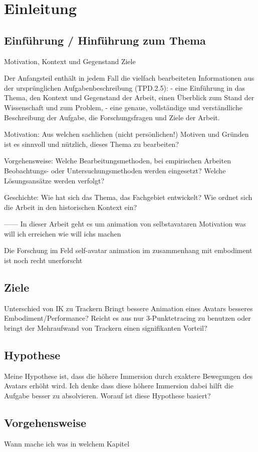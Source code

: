 \chapter{Einleitung}

\section{Einführung / Hinführung zum Thema}
Motivation, Kontext und Gegenstand
Ziele

Der Anfangsteil enthält in jedem Fall die vielfach bearbeiteten Informationen aus der
ursprünglichen Aufgabenbeschreibung (TPD.2.5):
- eine Einführung in das Thema, den Kontext und Gegenstand der Arbeit, einen
Überblick zum Stand der Wissenschaft und zum Problem,
- eine genaue, vollständige und verständliche Beschreibung der Aufgabe, die Forschungsfragen und Ziele der Arbeit.

Motivation: Aus welchen sachlichen (nicht persönlichen!) Motiven und Gründen ist es
sinnvoll und nützlich, dieses Thema zu bearbeiten?

Vorgehensweise: Welche Bearbeitungsmethoden, bei empirischen Arbeiten Beobachtungs- oder Untersuchungsmethoden werden eingesetzt? Welche Lösungsansätze werden verfolgt?

Geschichte: Wie hat sich das Thema, das Fachgebiet entwickelt? Wie ordnet sich die
Arbeit in den historischen Kontext ein?

------
In dieser Arbeit geht es um animation von selbstavataren
Motivation
was will ich erreichen
wie will ichs machen

Die Forschung im Feld self-avatar animation im zusammenhang mit embodiment ist noch recht unerforscht

\section{Ziele}
Unterschied von IK zu Trackern
Bringt bessere Animation eines Avatars besseres Embodiment/Performance?
Reicht es aus nur 3-Punktetracing zu benutzen oder bringt der Mehraufwand von Trackern einen signifikanten Vorteil?

\section{Hypothese}
Meine Hypothese ist, dass die höhere Immersion durch exaktere Bewegungen des Avatars erhöht wird. Ich denke dass diese höhere Immersion dabei hilft die Aufgabe besser zu absolvieren.
Worauf ist diese Hypothese basiert?


\section{Vorgehensweise}
Wann mache ich was
in welchem Kapitel
